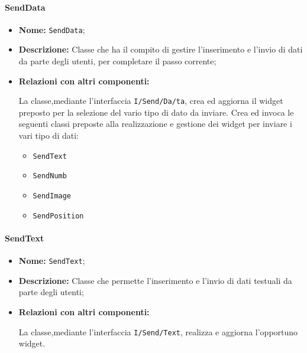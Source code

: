 \paragraph{SendData}
\begin{flushleft}
\begin{itemize}
\item \textbf{Nome:} \texttt{SendData};
\item \textbf{Descrizione:} Classe che ha il compito di gestire l'inserimento e l'invio di dati da parte degli utenti, per completare il passo corrente;
\item \textbf{Relazioni con altri componenti:}
\begin{sloppypar}
La classe,mediante l'interfaccia \texttt{I\fshyp{}Send\fshyp{}Da\fshyp{}ta}, crea ed aggiorna il widget preposto per la selezione del vario tipo di dato da inviare. Crea ed invoca le seguenti classi preposte alla realizzazione e gestione dei widget per inviare i vari tipo di dati:
\begin{itemize}
	\item \texttt{SendText}
	\item \texttt{SendNumb}
	\item \texttt{SendImage}
	\item \texttt{SendPosition}
\end{itemize}
\end{sloppypar}
\end{itemize}
\end{flushleft}

\paragraph{SendText}
\begin{flushleft}
\begin{itemize}
\item \textbf{Nome:} \texttt{SendText};
\item \textbf{Descrizione:} Classe che permette l'inserimento e l'invio di dati testuali da parte degli utenti;
\item \textbf{Relazioni con altri componenti:}
\begin{sloppypar}
La classe,mediante l'interfaccia \texttt{I\fshyp{}Send\fshyp{}Text}, realizza e aggiorna l'opportuno widget.
\end{sloppypar}
\end{itemize}
\end{flushleft}

